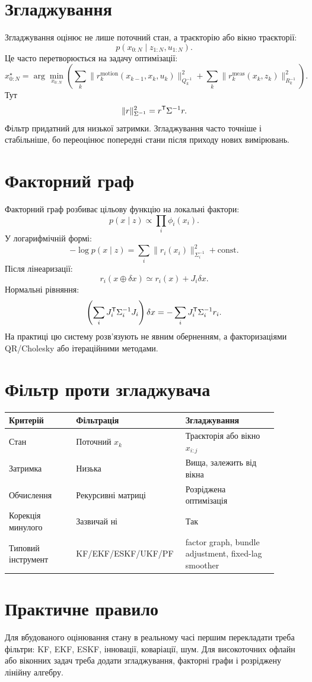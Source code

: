 \section{Згладжування}

Згладжування оцінює не лише поточний стан, а траєкторію або вікно траєкторії:
\[
p(x_{0:N}\mid z_{1:N},u_{1:N}).
\]
Це часто перетворюється на задачу оптимізації:
\[
x_{0:N}^{\star}
=
\arg\min_{x_{0:N}}
\left(
\sum_k \|r_k^{\mathrm{motion}}(x_{k-1},x_k,u_k)\|_{Q_k^{-1}}^2
+
\sum_k \|r_k^{\mathrm{meas}}(x_k,z_k)\|_{R_k^{-1}}^2
\right).
\]
Тут
\[
\|r\|_{\Sigma^{-1}}^2 = r^{\mathsf{T}}\Sigma^{-1}r.
\]
Фільтр придатний для низької затримки. Згладжування часто точніше і стабільніше, бо переоцінює попередні стани після приходу нових вимірювань.

\section{Факторний граф}

Факторний граф розбиває цільову функцію на локальні фактори:
\[
p(x\mid z)\propto \prod_i \phi_i(x_i).
\]
У логарифмічній формі:
\[
-\log p(x\mid z)=\sum_i \|r_i(x_i)\|_{\Sigma_i^{-1}}^2+\mathrm{const}.
\]
Після лінеаризації:
\[
r_i(x\oplus\delta x)\simeq r_i(x)+J_i\delta x.
\]
Нормальні рівняння:
\[
\left(\sum_i J_i^{\mathsf{T}}\Sigma_i^{-1}J_i\right)\delta x
=
-\sum_i J_i^{\mathsf{T}}\Sigma_i^{-1}r_i.
\]
На практиці цю систему розв'язують не явним оберненням, а факторизаціями QR/Cholesky або ітераційними методами.

\section{Фільтр проти згладжувача}

\begin{longtable}{L{0.24\linewidth}L{0.33\linewidth}L{0.33\linewidth}}
\toprule
Критерій & Фільтрація & Згладжування\\
\midrule
Стан & Поточний $x_k$ & Траєкторія або вікно $x_{i:j}$\\
Затримка & Низька & Вища, залежить від вікна\\
Обчислення & Рекурсивні матриці & Розріджена оптимізація\\
Корекція минулого & Зазвичай ні & Так\\
Типовий інструмент & KF/EKF/ESKF/UKF/PF & factor graph, bundle adjustment, fixed-lag smoother\\
\bottomrule
\end{longtable}

\section{Практичне правило}

Для вбудованого оцінювання стану в реальному часі першим перекладати треба фільтри: KF, EKF, ESKF, інновації, коваріації, шум. Для високоточних офлайн або віконних задач треба додати згладжування, факторні графи і розріджену лінійну алгебру.

